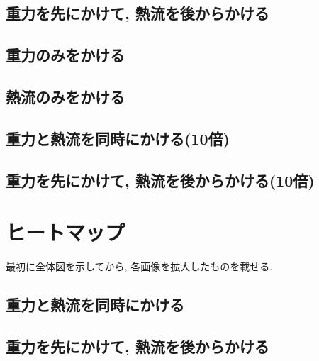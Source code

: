 

\subsection{重力を先にかけて, 熱流を後からかける}



\subsection{重力のみをかける}



\subsection{熱流のみをかける}



\subsection{重力と熱流を同時にかける(10倍)}



\subsection{重力を先にかけて, 熱流を後からかける(10倍)}




\section{ヒートマップ}

最初に全体図を示してから, 各画像を拡大したものを載せる.

\subsection{重力と熱流を同時にかける}





\subsection{重力を先にかけて, 熱流を後からかける}

